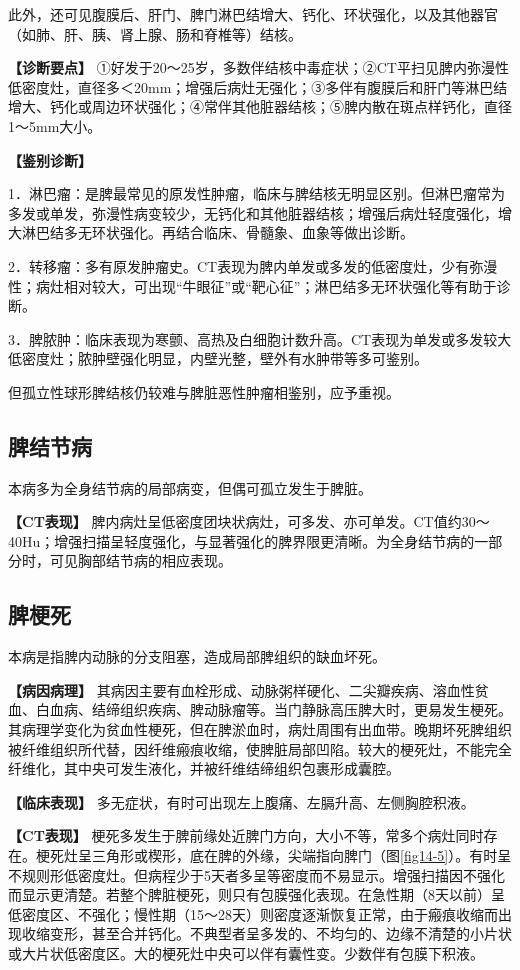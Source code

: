 此外，还可见腹膜后、肝门、脾门淋巴结增大、钙化、环状强化，以及其他器官（如肺、肝、胰、肾上腺、肠和脊椎等）结核。

\textbf{【诊断要点】}
①好发于20～25岁，多数伴结核中毒症状；②CT平扫见脾内弥漫性低密度灶，直径多＜20mm；增强后病灶无强化；③多伴有腹膜后和肝门等淋巴结增大、钙化或周边环状强化；④常伴其他脏器结核；⑤脾内散在斑点样钙化，直径1～5mm大小。

\textbf{【鉴别诊断】}

1．淋巴瘤：是脾最常见的原发性肿瘤，临床与脾结核无明显区别。但淋巴瘤常为多发或单发，弥漫性病变较少，无钙化和其他脏器结核；增强后病灶轻度强化，增大淋巴结多无环状强化。再结合临床、骨髓象、血象等做出诊断。

2．转移瘤：多有原发肿瘤史。CT表现为脾内单发或多发的低密度灶，少有弥漫性；病灶相对较大，可出现“牛眼征”或“靶心征”；淋巴结多无环状强化等有助于诊断。

3．脾脓肿：临床表现为寒颤、高热及白细胞计数升高。CT表现为单发或多发较大低密度灶；脓肿壁强化明显，内壁光整，壁外有水肿带等多可鉴别。

但孤立性球形脾结核仍较难与脾脏恶性肿瘤相鉴别，应予重视。

\subsection{脾结节病}

本病多为全身结节病的局部病变，但偶可孤立发生于脾脏。

\textbf{【CT表现】}
脾内病灶呈低密度团块状病灶，可多发、亦可单发。CT值约30～40Hu；增强扫描呈轻度强化，与显著强化的脾界限更清晰。为全身结节病的一部分时，可见胸部结节病的相应表现。

\subsection{脾梗死}

本病是指脾内动脉的分支阻塞，造成局部脾组织的缺血坏死。

\textbf{【病因病理】}
其病因主要有血栓形成、动脉粥样硬化、二尖瓣疾病、溶血性贫血、白血病、结缔组织疾病、脾动脉瘤等。当门静脉高压脾大时，更易发生梗死。其病理学变化为贫血性梗死，但在脾淤血时，病灶周围有出血带。晚期坏死脾组织被纤维组织所代替，因纤维瘢痕收缩，使脾脏局部凹陷。较大的梗死灶，不能完全纤维化，其中央可发生液化，并被纤维结缔组织包裹形成囊腔。

\textbf{【临床表现】}
多无症状，有时可出现左上腹痛、左膈升高、左侧胸腔积液。

\textbf{【CT表现】}
梗死多发生于脾前缘处近脾门方向，大小不等，常多个病灶同时存在。梗死灶呈三角形或楔形，底在脾的外缘，尖端指向脾门（图\ref{fig14-5}）。有时呈不规则形低密度灶。但病程少于5天者多呈等密度而不易显示。增强扫描因不强化而显示更清楚。若整个脾脏梗死，则只有包膜强化表现。在急性期（8天以前）呈低密度区、不强化；慢性期（15～28天）则密度逐渐恢复正常，由于瘢痕收缩而出现收缩变形，甚至合并钙化。不典型者呈多发的、不均匀的、边缘不清楚的小片状或大片状低密度区。大的梗死灶中央可以伴有囊性变。少数伴有包膜下积液。

